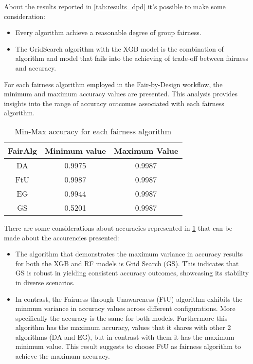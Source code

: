 About the results reported in \cref{tab:results_dpd} it's possible to make some consideration:

\begin{itemize}
        \item Every algorithm achieve a reasonable degree of group fairness.

        \item The GridSearch algorithm with the XGB model is the combination of algorithm and model that fails into the achieving of trade-off between fairness and accuracy.

\end{itemize}

For each fairness algorithm employed in the Fair-by-Design workflow, the minimum and maximum accuracy values are presented. This analysis provides insights into the range of accuracy outcomes associated with each fairness algorithm.

\begin{table}
    \centering
    \begin{tabular}{|c|c|c|}
        \hline
        \textbf{FairAlg} & \textbf{Minimum value} & \textbf{Maximum Value} \\
        \hline
        DA & 0.9975 & 0.9987 \\
        \hline
        FtU & 0.9987 & 0.9987 \\
        \hline
        EG & 0.9944 & 0.9987 \\
        \hline
        GS & 0.5201 & 0.9987 \\
        \hline
    \end{tabular}
    \caption{Min-Max accuracy for each fairness algorithm}
    \label{tab:accuracies}
\end{table}

There are some considerations about accuracies represented in \cref{tab:accuracies} that can be made about the accurencies presented:
\begin{itemize}

    \item The algorithm that demonstrates the maximum variance in accuracy results for both the XGB and RF models is Grid Search (GS). This indicates that GS is robust in yielding consistent accuracy outcomes, showcasing its stability in diverse scenarios.

    \item In contrast, the Fairness through Unawareness (FtU) algorithm exhibits the minmum variance in accuracy values across different configurations. More specifically the accuracy is the same for both models. Furthermore this algorithm has the maximum accuracy, values that it shares with other 2 algorithms (DA and EG), but in contrast with them it has the maximum minimum value. This result suggests to choose FtU as fairness algorithm to achieve the maximum accuracy.
\end{itemize}

